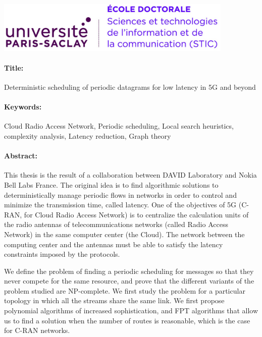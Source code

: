 \includegraphics[height=2.45cm]{logostic.PNG}
\vspace{1cm}
\begin{mdframed}[linecolor=Prune,linewidth=1]
\vspace{-.25cm}
\paragraph*{Title:} Deterministic scheduling of periodic datagrams for low latency in 5G and beyond 

\begin{small}
\vspace{-.25cm}
\paragraph*{Keywords:}  Cloud Radio Access Network, Periodic scheduling, Local search heuristics, complexity analysis, Latency reduction,  Graph theory
\vspace{-.5cm}
\begin{multicols}{2}
\paragraph*{Abstract:} This thesis is the result of a collaboration between DAVID Laboratory and Nokia Bell Labs France.
The original idea is to find algorithmic solutions to deterministically manage periodic flows in networks in order to control and minimize the transmission time, called latency. One of the objectives of 5G (C-RAN, for Cloud Radio Access Network) is to centralize the calculation units of the radio antennas of telecommunications networks (called Radio Access Network) in the same computer center (the Cloud). The network between the computing center and the antennas must be able to satisfy the latency constraints imposed by the protocols.

We define the problem of finding a periodic scheduling for messages so that they never compete for the same resource, and prove that the different variants of the problem studied are NP-complete. We first study the problem for a particular topology in which all the streams share the same link. We first propose polynomial algorithms of increased sophistication, and FPT algorithms that allow us to find a solution when the number of routes is reasonable, which is the case for C-RAN networks.


\end{multicols}
\end{small}
\end{mdframed}
